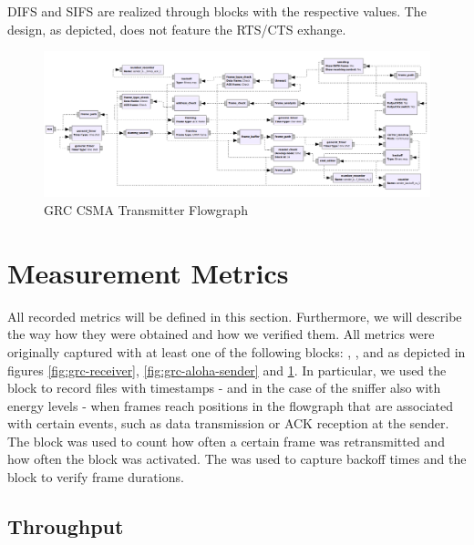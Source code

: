 DIFS and SIFS are realized through  blocks with the respective values. The design, as depicted, does not feature the RTS/CTS exhange.

\begin{figure}
	\label{fig:grc-csma-sender}
	\begin{center}
		\includegraphics[width=\textwidth]{pictures/grc_csma_transmitter_flowgraph}
\end{center}
\caption{GRC CSMA Transmitter Flowgraph}
\end{figure}

\clearpage

\section{Measurement Metrics}
\label{sec:measurement-metrics}

All recorded metrics will be defined in this section. Furthermore, we will describe the way how they were obtained and how we verified them. All metrics were originally captured with at least one of the following blocks: , ,  and  as depicted in figures \ref{fig:grc-receiver}, \ref{fig:grc-aloha-sender} and \ref{fig:grc-csma-sender}. In particular, we used the  block to record files with timestamps - and in the case of the sniffer also with energy levels - when frames reach positions in the flowgraph that are associated with certain events, such as data transmission or ACK reception at the sender. The  block was used to count how often a certain frame was retransmitted and how often the  block was activated. The  was used to capture backoff times and the  block to verify frame durations.

\subsection{Throughput}

